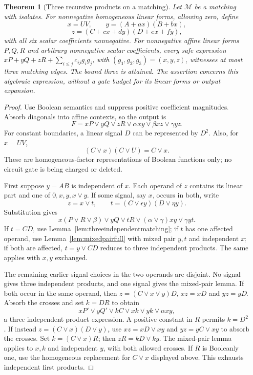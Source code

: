 \documentclass[11pt]{article}
\newtheorem{theorem}{Theorem}[section]
\theoremstyle{definition}
\theoremstyle{remark}
\begin{document}
\begin{theorem}[Three recursive products on a matching]\label{thm:threerecursive}
Let $\mathcal M$ be a matching with isolates. For nonnegative homogeneous linear forms, allowing zero, define
\[
 x=UV,\qquad y=(A+ax)(B+bx),
\]
\[
 z=(C+cx+dy)(D+ex+fy),
\]
with all six scalar coefficients nonnegative. For nonnegative affine linear forms $P,Q,R$ and arbitrary nonnegative scalar coefficients, every safe expression $xP+yQ+zR+\sum_{i\le j}c_{ij}g_ig_j$, with $(g_1,g_2,g_3)=(x,y,z)$, witnesses at most three matching edges. The bound three is attained. The assertion concerns this algebraic expression, without a gate budget for its linear forms or output expansion.
\end{theorem}
\begin{proof}
Use Boolean semantics and suppress positive coefficient magnitudes. Absorb diagonals into affine contexts, so the output is
\[
 F=xP\vee yQ\vee zR\vee\alpha xy\vee\beta xz\vee\gamma yz.
\]
For constant boundaries, a linear signal $D$ can be represented by $D^2$. Also, for $x=UV$,
\[
 (C\vee x)(C\vee U)=C\vee x.
\]
These are homogeneous-factor representations of Boolean functions only; no circuit gate is being charged or deleted.

First suppose $y=AB$ is independent of $x$. Each operand of $z$ contains its linear part and one of $0,x,y,x\vee y$. If some signal, say $x$, occurs in both, write
\[
 z=x\vee t,\qquad t=(C\vee\epsilon y)(D\vee\eta y).
\]
Substitution gives
\[
 x(P\vee R\vee\beta)\vee yQ\vee tR
       \vee(\alpha\vee\gamma)xy\vee\gamma yt.
\]
If $t=CD$, use Lemma~\ref{lem:threeindependentmatching}; if $t$ has one affected operand, use Lemma~\ref{lem:mixedpairfull} with mixed pair $y,t$ and independent $x$; if both are affected, $t=y\vee CD$ reduces to three independent products. The same applies with $x,y$ exchanged.

The remaining earlier-signal choices in the two operands are disjoint. No signal gives three independent products, and one signal gives the mixed-pair lemma. If both occur in the same operand, then $z=(C\vee x\vee y)D$, $xz=xD$ and $yz=yD$. Absorb the crosses and set $k=DR$ to obtain
\[
 xP'\vee yQ'\vee kC\vee xk\vee yk\vee\alpha xy,
\]
a three-independent-product expression. A positive constant in $R$ permits $k=D^2$. If instead $z=(C\vee x)(D\vee y)$, use $xz=xD\vee xy$ and $yz=yC\vee xy$ to absorb the crosses. Set $k=(C\vee x)R$; then $zR=kD\vee ky$. The mixed-pair lemma applies to $x,k$ and independent $y$, with both allowed crosses. If $R$ is Booleanly one, use the homogeneous replacement for $C\vee x$ displayed above. This exhausts independent first products.


\end{proof}
\end{document}
